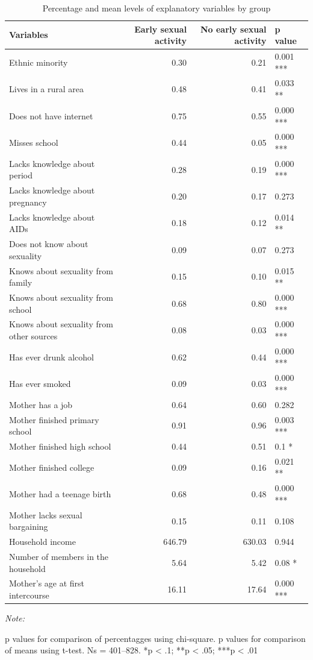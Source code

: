 \documentclass[
]{article}
\begin{document}
\begin{table}

\caption{\label{tab:unnamed-chunk-1}Percentage and mean levels of explanatory variables by group}
\centering
\begin{threeparttable}
\begin{tabular}[t]{lrrl}
\toprule
Variables & Early sexual activity & No early sexual activity & p value\\
\midrule
Ethnic minority & 0.30 & 0.21 & 0.001 ***\\
Lives in a rural area & 0.48 & 0.41 & 0.033 **\\
Does not have internet & 0.75 & 0.55 & 0.000 ***\\
Misses school & 0.44 & 0.05 & 0.000 ***\\
Lacks knowledge about period & 0.28 & 0.19 & 0.000 ***\\
\addlinespace
Lacks knowledge about pregnancy & 0.20 & 0.17 & 0.273\\
Lacks knowledge about AIDs & 0.18 & 0.12 & 0.014 **\\
Does not know about sexuality & 0.09 & 0.07 & 0.273\\
Knows about sexuality from family & 0.15 & 0.10 & 0.015 **\\
Knows about sexuality from school & 0.68 & 0.80 & 0.000 ***\\
\addlinespace
Knows about sexuality from other sources & 0.08 & 0.03 & 0.000 ***\\
Has ever drunk alcohol & 0.62 & 0.44 & 0.000 ***\\
Has ever smoked & 0.09 & 0.03 & 0.000 ***\\
Mother has a job & 0.64 & 0.60 & 0.282\\
Mother finished primary school & 0.91 & 0.96 & 0.003 ***\\
\addlinespace
Mother finished high school & 0.44 & 0.51 & 0.1  *\\
Mother finished college & 0.09 & 0.16 & 0.021 **\\
Mother had a teenage birth & 0.68 & 0.48 & 0.000 ***\\
Mother lacks sexual bargaining & 0.15 & 0.11 & 0.108\\
Household income & 646.79 & 630.03 & 0.944\\
\addlinespace
Number of members in the household & 5.64 & 5.42 & 0.08  *\\
Mother's age at first intercourse & 16.11 & 17.64 & 0.000 ***\\
\bottomrule
\end{tabular}
\begin{tablenotes}[para]
\item \textit{Note: } 
\item p values for comparison of percentagges using chi-square. p values for comparison of means using t-test. Ns = 401–828. *p < .1; **p < .05; ***p < .01
\end{tablenotes}
\end{threeparttable}
\end{table}
\end{document}
